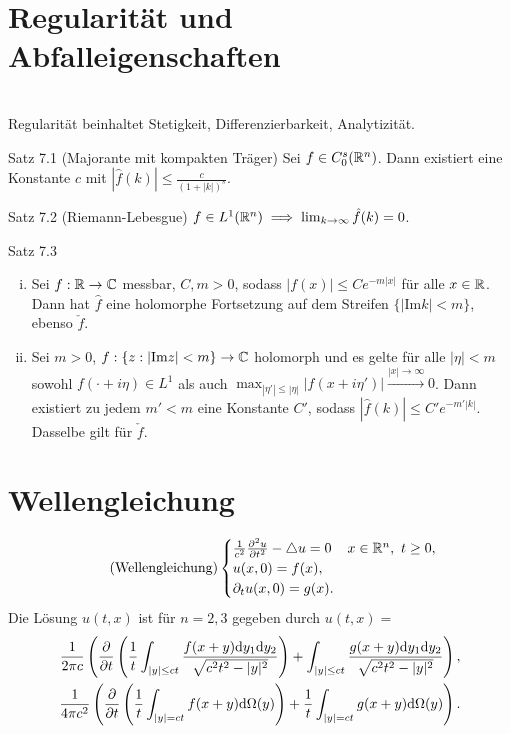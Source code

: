 \section{Regularität und Abfalleigenschaften}
\hspace*{\fill} \\
Regularität beinhaltet Stetigkeit, Differenzierbarkeit, Analytizität.

\begin{namedtheorem}{Satz 7.1 (Majorante mit kompakten Träger)}
  Sei $f\in C^s_0(\mathbb{R}^n)$. Dann existiert eine Konstante $c$ mit $|\hat{f}(k)| \leq \frac{c}{(1+|k|)^s}$.
\end{namedtheorem}

\begin{namedtheorem}{Satz 7.2 (Riemann-Lebesgue)}
  $f\in L^1(\mathbb{R}^n) \implies \lim_{k\rightarrow\infty} \hat{f}(k) = 0$.
\end{namedtheorem}

\begin{namedtheorem}{Satz 7.3}
  \begin{enumerate}[(i)]
    \item Sei $f:\mathbb{R}\rightarrow\mathbb{C}$ messbar, $C,m>0$, sodass $|f(x)|\leq C e^{-m|x|}$ für alle $x\in\mathbb{R}$. Dann hat $\hat{f}$ eine holomorphe Fortsetzung auf dem Streifen $\{|\mathrm{Im}k|<m\}$, ebenso $\check{f}$.
    \item Sei $m>0$, $f:\{z: |\mathrm{Im}z| <m\} \rightarrow\mathbb{C}$ holomorph und es gelte für alle $|\eta|<m$ sowohl $f(\cdot+i\eta) \in L^1$ als auch $\max_{|\eta'|\leq|\eta|} |f(x+i\eta')| \overset{|x|\rightarrow\infty}{\rightarrow} 0$. Dann existiert zu jedem $m'<m$ eine Konstante $C'$, sodass $|\hat{f}(k)|\leq C'e^{-m'|k|}$. Dasselbe gilt für $\check{f}$.
  \end{enumerate}
\end{namedtheorem}

\section{Wellengleichung}
\begin{align*}
  \tag{Wellengleichung}
  \begin{cases}
    \frac1{c^2}\frac{\partial^2 u}{\partial t^2} - \triangle u = 0 &  x\in\mathbb{R}^n,\ t \geq 0, \\
    u(x,0) = f(x),\\
    \partial_t u(x,0)=g(x).
  \end{cases}
\end{align*}
Die Lösung $u(t,x)$ ist für $n=2,3$ gegeben durch $u(t,x)=$ 
\begin{align*}
  \frac1{2\pi c}\left(\frac{\partial}{\partial t} \left(\frac1t\int_{|y|\leq ct}\frac{f(x+y)\mathrm{d} y_1 \mathrm{d} y_2}{\sqrt{c^2t^2-|y|^2}}\right) + \int_{|y|\leq ct}\frac{g(x+y)\mathrm{d} y_1 \mathrm{d} y_2}{\sqrt{c^2t^2-|y|^2}}\right),\\
  \frac1{4\pi c^2}\left(\frac{\partial}{\partial t} \left(\frac1t\int_{|y|=ct}f(x+y)\mathrm{d}\Omega(y)\right) + \frac1t\int_{|y|=ct}g(x+y)\mathrm{d}\Omega(y)\right).
\end{align*}


